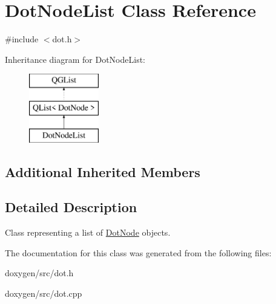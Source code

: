 \hypertarget{class_dot_node_list}{}\section{Dot\+Node\+List Class Reference}
\label{class_dot_node_list}


{\ttfamily \#include $<$dot.\+h$>$}

Inheritance diagram for Dot\+Node\+List\+:\begin{figure}[H]
\begin{center}
\leavevmode
\includegraphics[height=3.000000cm]{class_dot_node_list}
\end{center}
\end{figure}
\subsection*{Additional Inherited Members}


\subsection{Detailed Description}
Class representing a list of \mbox{\hyperlink{class_dot_node}{Dot\+Node}} objects. 

The documentation for this class was generated from the following files\+:\begin{DoxyCompactItemize}
\item 
doxygen/src/dot.\+h\item 
doxygen/src/dot.\+cpp\end{DoxyCompactItemize}
